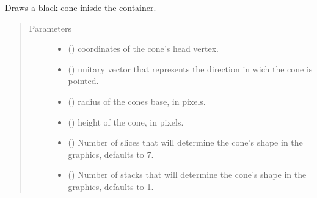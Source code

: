 \documentclass[a4paper,11pt,oneside,english]{sphinxmanual}
\begin{document}

\begin{fulllineitems}
\label{\detokenize{graphics:graphics.draw_cone}}
Draws a black cone inisde the container.
\begin{quote}\begin{description}
\item[{Parameters}] \leavevmode\begin{itemize}
\item {} 
 () \textendash{} coordinates of the cone’s head vertex.

\item {} 
 () \textendash{} unitary vector that represents the direction in wich the cone is pointed.

\item {} 
 () \textendash{} radius of the cones base, in pixels.

\item {} 
 () \textendash{} height of the cone, in pixels.

\item {} 
 (\sphinxstyleliteralemphasis{\sphinxupquote{, }}) \textendash{} Number of slices that will determine the cone’s shape in the graphics, defaults to 7.

\item {} 
 (\sphinxstyleliteralemphasis{\sphinxupquote{, }}) \textendash{} Number of stacks that will determine the cone’s shape in the graphics, defaults to 1.

\end{itemize}

\end{description}\end{quote}

\bigskip 
\bigskip 

\end{fulllineitems}
\end{document}
